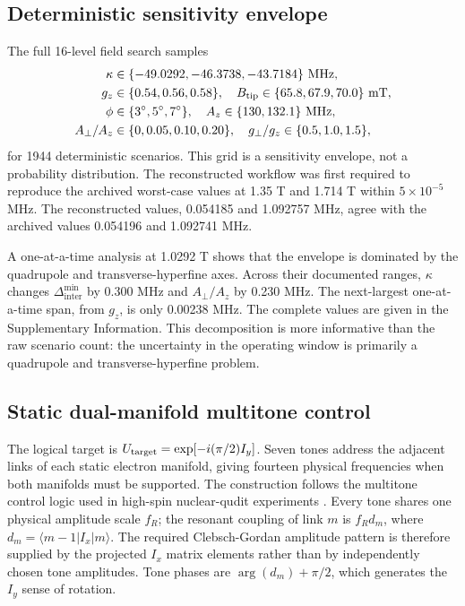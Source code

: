 \documentclass[11pt]{article}
\newcommand{\DeltaInter}{\Delta_{\mathrm{inter}}^{\min}}
\newcommand{\fR}{f_R}
\begin{document}
\subsection{Deterministic sensitivity envelope}
The full 16-level field search samples
\begin{align*}
\kappa&\in\{-49.0292,-46.3738,-43.7184\}\ {\rm MHz},\\
g_z&\in\{0.54,0.56,0.58\},\quad B_{\rm tip}\in\{65.8,67.9,70.0\}\ {\rm mT},\\
\phi&\in\{3^\circ,5^\circ,7^\circ\},\quad A_z\in\{130,132.1\}\ {\rm MHz},\\
A_\perp/A_z&\in\{0,0.05,0.10,0.20\},\quad g_\perp/g_z\in\{0.5,1.0,1.5\},
\end{align*}
for 1944 deterministic scenarios. This grid is a sensitivity envelope, not a probability distribution. The reconstructed workflow was first required to reproduce the archived worst-case values at 1.35 T and 1.714 T within $5\times10^{-5}$ MHz. The reconstructed values, 0.054185 and 1.092757 MHz, agree with the archived values 0.054196 and 1.092741 MHz.

A one-at-a-time analysis at 1.0292 T shows that the envelope is dominated by the quadrupole and transverse-hyperfine axes. Across their documented ranges, $\kappa$ changes $\DeltaInter$ by 0.300 MHz and $A_\perp/A_z$ by 0.230 MHz. The next-largest one-at-a-time span, from $g_z$, is only 0.00238 MHz. The complete values are given in the Supplementary Information. This decomposition is more informative than the raw scenario count: the uncertainty in the operating window is primarily a quadrupole and transverse-hyperfine problem.

\subsection{Static dual-manifold multitone control}
The logical target is $U_{\rm target}=\exp[-i(\pi/2)I_y]$. Seven tones address the adjacent links of each static electron manifold, giving fourteen physical frequencies when both manifolds must be supported. The construction follows the multitone control logic used in high-spin nuclear-qudit experiments \cite{asaad2020,fernandez2024,yu2025}. Every tone shares one physical amplitude scale $\fR$; the resonant coupling of link $m$ is $\fR d_m$, where $d_m=\langle m-1|I_x|m\rangle$. The required Clebsch-Gordan amplitude pattern is therefore supplied by the projected $I_x$ matrix elements rather than by independently chosen tone amplitudes. Tone phases are $\arg(d_m)+\pi/2$, which generates the $I_y$ sense of rotation.
\end{document}
